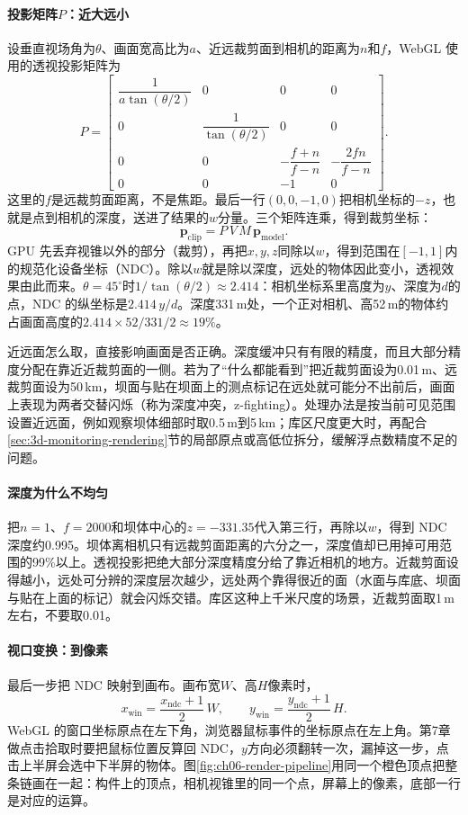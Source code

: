 \paragraph{投影矩阵$P$：近大远小}设垂直视场角为$\theta$、画面宽高比为$a$、近远裁剪面到相机的距离为$n$和$f$，WebGL 使用的透视投影矩阵为
\[
P=\begin{bmatrix}
\dfrac{1}{a\tan(\theta/2)}&0&0&0\\
0&\dfrac{1}{\tan(\theta/2)}&0&0\\
0&0&-\dfrac{f+n}{f-n}&-\dfrac{2fn}{f-n}\\
0&0&-1&0
\end{bmatrix}.
\]
这里的$f$是远裁剪面距离，不是焦距。最后一行$(0,0,-1,0)$把相机坐标的$-z$，也就是点到相机的深度，送进了结果的$w$分量。三个矩阵连乘，得到裁剪坐标：
\[
  \mathbf{p}_{\mathrm{clip}}=P\,V\,M\,\mathbf{p}_{\mathrm{model}}.
\]
GPU 先丢弃视锥以外的部分（裁剪），再把$x,y,z$同除以$w$，得到范围在$[-1,1]$内的规范化设备坐标（NDC）。除以$w$就是除以深度，远处的物体因此变小，透视效果由此而来。$\theta=45^\circ$时$1/\tan(\theta/2)\approx2.414$：相机坐标系里高度为$y$、深度为$d$的点，NDC 的纵坐标是$2.414\,y/d$。深度331\,m处，一个正对相机、高52\,m的物体约占画面高度的$2.414\times52/331/2\approx19\%$。

近远面怎么取，直接影响画面是否正确。深度缓冲只有有限的精度，而且大部分精度分配在靠近近裁剪面的一侧。若为了“什么都能看到”把近裁剪面设为0.01\,m、远裁剪面设为50\,km，坝面与贴在坝面上的测点标记在远处就可能分不出前后，画面上表现为两者交替闪烁（称为深度冲突，z-fighting）。处理办法是按当前可见范围设置近远面，例如观察坝体细部时取0.5\,m到5\,km；库区尺度更大时，再配合\ref{sec:3d-monitoring-rendering}节的局部原点或高低位拆分，缓解浮点数精度不足的问题。

\paragraph{深度为什么不均匀}把$n=1$、$f=2000$和坝体中心的$z=-331.35$代入第三行，再除以$w$，得到 NDC 深度约0.995。坝体离相机只有远裁剪面距离的六分之一，深度值却已用掉可用范围的99\%以上。透视投影把绝大部分深度精度分给了靠近相机的地方。近裁剪面设得越小，远处可分辨的深度层次越少，远处两个靠得很近的面（水面与库底、坝面与贴在上面的标记）就会闪烁交错。库区这种上千米尺度的场景，近裁剪面取1\,m左右，不要取0.01。

\paragraph{视口变换：到像素}最后一步把 NDC 映射到画布。画布宽$W$、高$H$像素时，
\[
  x_{\mathrm{win}}=\frac{x_{\mathrm{ndc}}+1}{2}\,W,\qquad
  y_{\mathrm{win}}=\frac{y_{\mathrm{ndc}}+1}{2}\,H .
\]
WebGL 的窗口坐标原点在左下角，浏览器鼠标事件的坐标原点在左上角。第7章做点击拾取时要把鼠标位置反算回 NDC，$y$方向必须翻转一次，漏掉这一步，点击上半屏会选中下半屏的物体。图\ref{fig:ch06-render-pipeline}用同一个橙色顶点把整条链画在一起：构件上的顶点，相机视锥里的同一个点，屏幕上的像素，底部一行是对应的运算。

